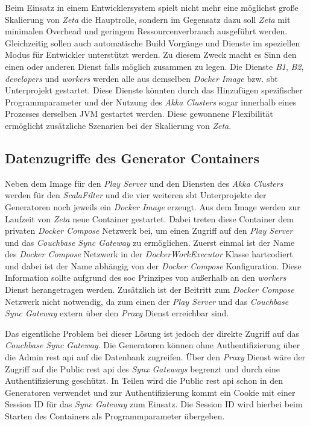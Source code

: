 Beim Einsatz in einem Entwicklersystem spielt nicht mehr eine möglichst große Skalierung von \textit{Zeta} die Hauptrolle, sondern im Gegensatz dazu soll \textit{Zeta} mit minimalen Overhead und geringem Ressourcenverbrauch ausgeführt werden. Gleichzeitig sollen auch automatische Build Vorgänge und Dienste im speziellen Modus für Entwickler unterstützt werden. Zu diesem Zweck macht es Sinn den einen oder anderen Dienst falls möglich zusammen zu legen. Die Dienste \textit{B1}, \textit{B2}, \textit{developers} und \textit{workers} werden alle aus demselben \textit{Docker Image} bzw. \ac{sbt} Unterprojekt gestartet. Diese Dienste könnten durch das Hinzufügen spezifischer Programmparameter und der Nutzung des \textit{Akka Clusters} sogar innerhalb eines Prozesses derselben JVM gestartet werden. Diese gewonnene Flexibilität ermöglicht zusätzliche Szenarien bei der Skalierung von \textit{Zeta}.

\subsection{Datenzugriffe des Generator Containers}

Neben dem Image für den \textit{Play Server} und den Diensten des \textit{Akka Clusters} werden für den \textit{ScalaFilter} und die vier weiteren \ac{sbt} Unterprojekte der Generatoren noch jeweils ein \textit{Docker Image} erzeugt. Aus dem Image werden zur Laufzeit von \textit{Zeta} neue Container gestartet. Dabei treten diese Container dem privaten \textit{Docker Compose} Netzwerk bei, um einen Zugriff auf den \textit{Play Server} und das \textit{Couchbase Sync Gateway} zu ermöglichen. Zuerst einmal ist der Name des \textit{Docker Compose} Netzwerk in der \textit{DockerWorkExecutor} Klasse hartcodiert und dabei ist der Name abhängig von der \textit{Docker Compose} Konfiguration. Diese Information sollte aufgrund des \ac{soc} Prinzipes von außerhalb an den \textit{workers} Dienst herangetragen werden. Zusätzlich ist der Beitritt zum \textit{Docker Compose} Netzwerk nicht notwendig, da zum einen der \textit{Play Server} und das \textit{Couchbase Sync Gateway} extern über den \textit{Proxy} Dienst erreichbar sind.

Das eigentliche Problem bei dieser Lösung ist jedoch der direkte Zugriff auf das \textit{Couchbase Sync Gateway}. Die Generatoren können ohne Authentifizierung über die Admin \ac{rest} \ac{api} auf die Datenbank zugreifen. Über den \textit{Proxy} Dienst wäre der Zugriff auf die Public \ac{rest} \ac{api} des \textit{Synx Gateways} begrenzt und durch eine Authentifizierung geschützt. In Teilen wird die Public \ac{rest} \ac{api} schon in den Generatoren verwendet und zur Authentifizierung kommt ein Cookie mit einer Session ID für das \textit{Sync Gateway} zum Einsatz. Die Session ID wird hierbei beim Starten des Containers als Programmparameter übergeben.

